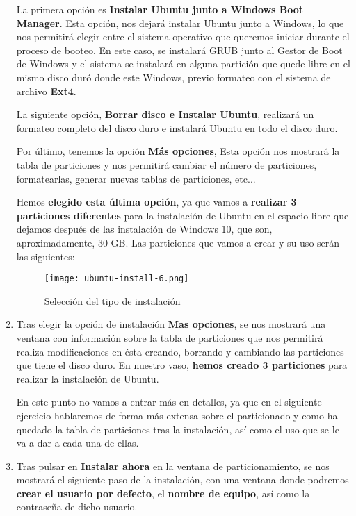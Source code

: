 \begin{enumerate}
    La primera opción es \textbf{Instalar Ubuntu junto a Windows Boot Manager}. Esta opción, nos dejará instalar Ubuntu junto a Windows, lo que nos permitirá elegir entre el sistema operativo que queremos iniciar durante el proceso de booteo. En este caso, se instalará GRUB junto al Gestor de Boot de Windows y el sistema se instalará en alguna partición que quede libre en el mismo disco duró donde este Windows, previo formateo con el sistema de archivo \textbf{Ext4}.

    La siguiente opción, \textbf{Borrar disco e Instalar Ubuntu}, realizará un formateo completo del disco duro e instalará Ubuntu en todo el disco duro.

    Por último, tenemos la opción \textbf{Más opciones}, Esta opción nos mostrará la tabla de particiones y nos permitirá cambiar el número de particiones, formatearlas, generar nuevas tablas de particiones, etc...

    Hemos \textbf{elegido esta última opción}, ya que vamos a \textbf{realizar 3 particiones diferentes} para la instalación de Ubuntu en el espacio libre que dejamos después de las instalación de Windows 10, que son, aproximadamente, 30 GB. Las particiones que vamos a crear y su uso serán las siguientes:

    \begin{figure}[H]
        \centering
        \texttt{[image: ubuntu-install-6.png]}
        \caption{Selección del tipo de instalación}
    \end{figure}

    \item Tras elegir la opción de instalación \textbf{Mas opciones}, se nos mostrará una ventana con información sobre la tabla de particiones que nos permitirá realiza modificaciones en ésta creando, borrando y cambiando las particiones que tiene el disco duro. En nuestro vaso, \textbf{hemos creado 3 particiones} para realizar la instalación de Ubuntu.

    En este punto no vamos a entrar más en detalles, ya que en el siguiente ejercicio hablaremos de forma más extensa sobre el particionado y como ha quedado la tabla de particiones tras la instalación, así como el uso que se le va a dar a cada una de ellas.

    \item Tras pulsar en \textbf{Instalar ahora} en la ventana de particionamiento, se nos mostrará el siguiente paso de la instalación, con una ventana donde podremos \textbf{crear el usuario por defecto}, el \textbf{nombre de equipo}, así como la contraseña de dicho usuario.


\end{enumerate}
